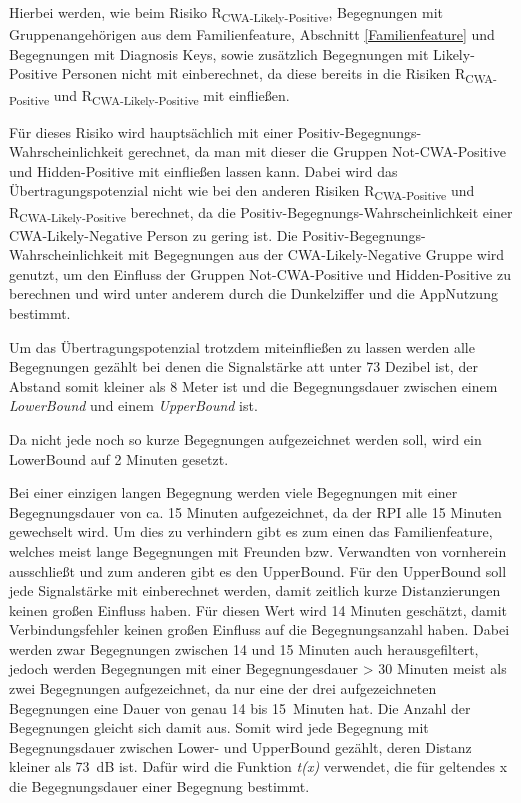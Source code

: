 \documentclass[conference,compsoc]{IEEEtran}
\begin{document}
Hierbei werden, wie beim Risiko R\textsubscript{CWA-Likely-Positive}, 
Begegnungen mit Gruppenangehörigen aus dem Familienfeature, Abschnitt \ref{Familienfeature} und Begegnungen mit Diagnosis Keys, 
sowie zusätzlich Begegnungen mit Likely-Positive Personen nicht mit einberechnet, 
da diese bereits in die Risiken R\textsubscript{CWA-Positive} und R\textsubscript{CWA-Likely-Positive} mit einfließen.

Für dieses Risiko wird hauptsächlich mit einer Positiv-Begegnungs-Wahrscheinlichkeit gerechnet,
da man mit dieser die Gruppen Not-CWA-Positive und Hidden-Positive mit einfließen lassen kann.
Dabei wird das Übertragungspotenzial nicht wie bei den anderen Risiken R\textsubscript{CWA-Positive} und R\textsubscript{CWA-Likely-Positive} berechnet, 
da die Positiv-Begegnungs-Wahrscheinlichkeit einer CWA-Likely-Negative Person zu gering ist. 
Die Positiv-Begegnungs-Wahrscheinlichkeit mit Begegnungen aus der CWA-Likely-Negative Gruppe wird genutzt,
um den Einfluss der Gruppen Not-CWA-Positive und Hidden-Positive zu berechnen und wird unter anderem durch die Dunkelziffer und die AppNutzung bestimmt.

Um das Übertragungspotenzial trotzdem miteinfließen zu lassen werden alle Begegnungen gezählt bei denen die Signalstärke att unter 73 Dezibel ist,
der Abstand somit kleiner als 8 Meter ist und die Begegnungsdauer zwischen einem \textit{LowerBound} und einem \textit{UpperBound} ist. 

Da nicht jede noch so kurze Begegnungen aufgezeichnet werden soll,
wird ein LowerBound auf 2 Minuten gesetzt. 

Bei einer einzigen langen Begegnung werden viele Begegnungen mit einer Begegnungsdauer von ca.
15 Minuten aufgezeichnet, da der RPI alle 15 Minuten gewechselt wird. 
Um dies zu verhindern gibt es zum einen das Familienfeature, 
welches meist lange Begegnungen mit Freunden bzw. Verwandten von vornherein ausschließt und zum anderen gibt es den UpperBound.
Für den UpperBound soll jede Signalstärke mit einberechnet werden, damit zeitlich kurze Distanzierungen keinen großen Einfluss haben.
Für diesen Wert wird 14 Minuten geschätzt, damit Verbindungsfehler keinen großen Einfluss auf die Begegnungsanzahl haben.
Dabei werden zwar Begegnungen zwischen 14 und 15 Minuten auch herausgefiltert, 
jedoch werden Begegnungen mit einer Begegnungesdauer > 30 Minuten meist als zwei Begegnungen aufgezeichnet,
da nur eine der drei aufgezeichneten Begegnungen eine Dauer von genau 14 bis \SI{15}{Minuten} hat.
Die Anzahl der Begegnungen gleicht sich damit aus.
Somit wird jede Begegnung mit Begegnungsdauer zwischen Lower- und UpperBound gezählt, deren Distanz kleiner als \SI{73}{dB} ist.
Dafür wird die Funktion \textit{t(x)} verwendet, die für geltendes x die Begegnungsdauer einer Begegnung bestimmt.
\end{document}
